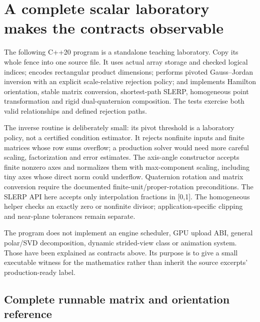 \section{A complete scalar laboratory makes the contracts observable}\label{02-foundations-ii-ch038-a-complete-scalar-laboratory-makes-the-contracts-observable}

The following C++20 program is a standalone teaching laboratory. Copy its whole fence into one source file. It uses actual array storage and checked logical indices; encodes rectangular product dimensions; performs pivoted Gauss--Jordan inversion with an explicit scale-relative rejection policy; and implements Hamilton orientation, stable matrix conversion, shortest-path SLERP, homogeneous point transformation and rigid dual-quaternion composition. The tests exercise both valid relationships and defined rejection paths.

The inverse routine is deliberately small: its pivot threshold is a laboratory policy, not a certified condition estimator. It rejects nonfinite inputs and finite matrices whose row sums overflow; a production solver would need more careful scaling, factorization and error estimates. The axis-angle constructor accepts finite nonzero axes and normalizes them with max-component scaling, including tiny axes whose direct norm could underflow. Quaternion rotation and matrix conversion require the documented finite-unit/proper-rotation preconditions. The SLERP API here accepts only interpolation fractions in {[}0,1{]}. The homogeneous helper checks an exactly zero or nonfinite divisor; application-specific clipping and near-plane tolerances remain separate.

The program does not implement an engine scheduler, GPU upload ABI, general polar/SVD decomposition, dynamic strided-view class or animation system. Those have been explained as contracts above. Its purpose is to give a small executable witness for the mathematics rather than inherit the source excerpts' production-ready label.

\subsection{Complete runnable matrix and orientation reference}\label{02-foundations-ii-ch038-complete-runnable-matrix-and-orientation-reference}


